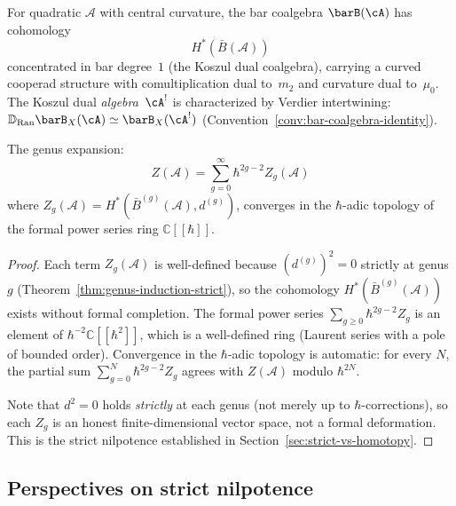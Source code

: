 \begin{corollary}\label{cor:koszul-dual-cooperad}
For quadratic $\mathcal{A}$ with central curvature, the bar
coalgebra $\barB(\cA)$ has cohomology
\begin{equation}
H^*(\bar{B}(\mathcal{A}))
\end{equation}
concentrated in bar degree~$1$ (the Koszul dual coalgebra), carrying a curved cooperad structure with comultiplication dual to~$m_2$ and curvature dual to~$\mu_0$.  The Koszul dual \emph{algebra}~$\cA^!$ is characterized by Verdier intertwining: $\mathbb{D}_{\operatorname{Ran}}\barB_X(\cA) \simeq \barB_X(\cA^!)$ (Convention~\ref{conv:bar-coalgebra-identity}).
\end{corollary}

\begin{corollary}\label{cor:genus-expansion-converges}
The genus expansion:
\begin{equation}
Z(\mathcal{A}) = \sum_{g=0}^\infty \hbar^{2g-2} Z_g(\mathcal{A})
\end{equation}
where $Z_g(\mathcal{A}) = H^*(\bar{B}^{(g)}(\mathcal{A}), d^{(g)})$, converges in the
$\hbar$-adic topology of the formal power series ring $\mathbb{C}[[\hbar]]$.
\end{corollary}

\begin{proof}
Each term $Z_g(\mathcal{A})$ is well-defined because
$(d^{(g)})^2 = 0$ strictly at genus $g$
(Theorem~\ref{thm:genus-induction-strict}), so the cohomology
$H^*(\bar{B}^{(g)}(\mathcal{A}))$ exists without formal completion.
The formal power series $\sum_{g \geq 0} \hbar^{2g-2} Z_g$ is an element of
$\hbar^{-2} \mathbb{C}[[\hbar^2]]$, which is a well-defined ring (Laurent series
with a pole of bounded order).  Convergence in the $\hbar$-adic topology is
automatic: for every $N$, the partial sum $\sum_{g=0}^N \hbar^{2g-2} Z_g$
agrees with $Z(\mathcal{A})$ modulo $\hbar^{2N}$.

Note that $d^2 = 0$ holds \emph{strictly} at each genus (not merely
up to $\hbar$-corrections), so each $Z_g$ is an honest finite-dimensional vector
space, not a formal deformation.  This is the strict nilpotence established in
Section~\ref{sec:strict-vs-homotopy}.
\end{proof}

\subsection{Perspectives on strict nilpotence}

